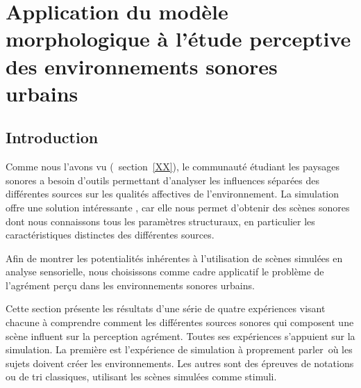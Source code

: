 \chapter[Application à l’étude perceptive des environnements sonores urbains]{Application du modèle morphologique à l’étude perceptive des environnements sonores urbains}\label{ch:psycho_xp}

\section{Introduction}

Comme nous l'avons vu (\Cf~section~\ref{XX}), le communauté étudiant  les paysages sonores a besoin d'outils permettant d'analyser les influences séparées des différentes sources  sur les qualités affectives de l'environnement. La simulation offre une solution intéressante , car elle nous permet d'obtenir des scènes sonores dont nous connaissons tous les paramètres structuraux, en particulier les caractéristiques distinctes des différentes sources. 
 
Afin de montrer les potentialités inhérentes à l'utilisation de scènes simulées en analyse sensorielle, nous choisissons comme cadre applicatif le problème de l'agrément perçu dans les environnements sonores urbains. 

Cette section présente les résultats d'une série de quatre expériences visant chacune à comprendre comment les différentes sources sonores qui composent une scène influent sur la perception agrément. Toutes ses expériences s'appuient sur la simulation. La première est l'expérience de simulation à proprement parler\ie~où les sujets doivent créer les environnements. Les autres sont des épreuves de notations ou de tri classiques, utilisant les scènes simulées comme stimuli. 


